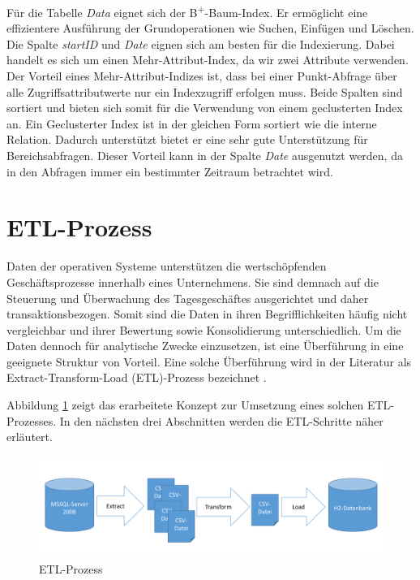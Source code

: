 Für die Tabelle \textit{Data} eignet sich der B\textsuperscript{+}-Baum-Index. Er ermöglicht eine effizientere Ausführung der Grundoperationen wie Suchen, Einfügen und Löschen. Die Spalte \textit{startID} und \textit{Date} eignen sich am besten für die Indexierung. Dabei handelt es sich um einen Mehr-Attribut-Index, da wir zwei Attribute verwenden. Der Vorteil eines Mehr-Attribut-Indizes ist, dass bei einer Punkt-Abfrage über alle Zugriffsattributwerte nur ein Indexzugriff erfolgen muss.
Beide Spalten sind sortiert und bieten sich somit für die Verwendung von einem geclusterten Index an. Ein Geclusterter Index ist in der gleichen Form sortiert wie die interne Relation. Dadurch unterstützt bietet er eine sehr gute Unterstützung für Bereichsabfragen. Dieser Vorteil kann in der Spalte \textit{Date} ausgenutzt werden, da in den Abfragen immer ein bestimmter Zeitraum betrachtet wird.


\section{ETL-Prozess}
\label{ch:konzeption:etl}

Daten der operativen Systeme unterstützen die wertschöpfenden Geschäftsprozesse innerhalb eines Unternehmens. Sie sind demnach auf die Steuerung und Überwachung des Tagesgeschäftes ausgerichtet und daher transaktionsbezogen. Somit sind die Daten in ihren Begrifflichkeiten häufig nicht vergleichbar und ihrer Bewertung sowie Konsolidierung unterschiedlich. Um die Daten dennoch für analytische Zwecke einzusetzen, ist eine Überführung in eine geeignete Struktur von Vorteil. Eine solche Überführung wird in der Literatur als Extract-Transform-Load (ETL)-Prozess bezeichnet \cite{ElSappagh201191}. 

Abbildung \ref{konzept:etl} zeigt das erarbeitete Konzept zur Umsetzung eines solchen ETL-Prozesses. In den nächsten drei Abschnitten werden die ETL-Schritte näher erläutert.

\begin{figure}[htbp]
\centering
  \includegraphics[width=1.0\textwidth, width=1.0\textwidth]{pics/ETL.pdf}
\caption{ETL-Prozess}
\label{konzept:etl}
\end{figure} 


